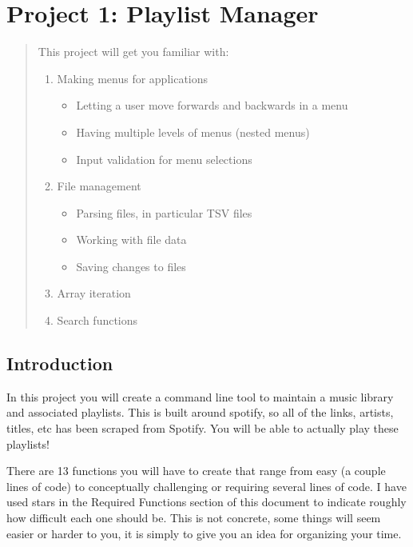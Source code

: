 \chapter*{Project 1: Playlist Manager}
\setcounter{chapter}{5}
\setcounter{section}{0}

\begin{abstract}
This project will get you familiar with:
\begin{enumerate}
    \item Making menus for applications
    \begin{itemize}
        \item Letting a user move forwards and backwards in a menu
        \item Having multiple levels of menus (nested menus)
        \item Input validation for menu selections
    \end{itemize}
    \item File management
    \begin{itemize}
        \item Parsing files, in particular TSV files
        \item Working with file data 
        \item Saving changes to files
    \end{itemize}
    \item Array iteration
    \item Search functions
\end{enumerate}
    
\end{abstract}

\section{Introduction}
In this project you will create a command line tool to maintain a music library and associated playlists. This is built around spotify, so all of the links, artists, titles, etc has been scraped from Spotify. You will be able to actually play these playlists!

There are 13 functions you will have to create that range from easy (a couple lines of code) to conceptually challenging or requiring several lines of code. I have used stars in the Required Functions section of this document to indicate roughly how difficult each one should be. This is not concrete, some things will seem easier or harder to you, it is simply to give you an idea for organizing your time. 

